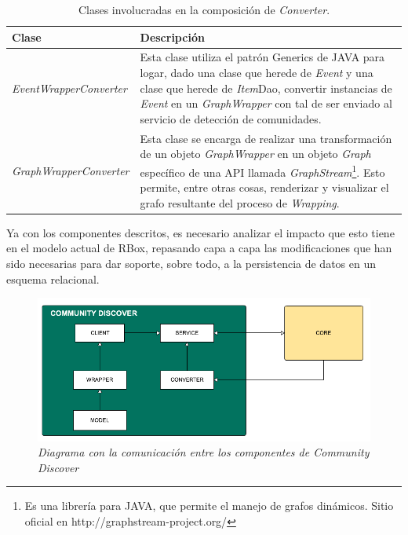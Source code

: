 \begin{table}[H]
  \begin{center}
    \caption{Clases involucradas en la composición de \textit{Converter}.}
    \label{tab:arq-tab05}
      \begin{tabular}{|L{4cm}|L{10cm}|}
        \hline
        \textbf{Clase} & \textbf{Descripción}\\ \hline
         \textit{\textit{Event}WrapperConverter} & Esta clase utiliza el patrón Generics de JAVA para logar, dado una clase que herede de \textit{Event} y una clase que herede de \textit{Item}Dao, convertir instancias de \textit{Event} en un \textit{GraphWrapper} con tal de ser enviado al servicio de detección de comunidades.\\ \hline
         \textit{GraphWrapperConverter} & Esta clase se encarga de realizar una transformación de un objeto \textit{GraphWrapper} en un objeto \textit{Graph} específico de una API llamada \textit{GraphStream}\footnote{Es una librería para JAVA, que permite el manejo de grafos dinámicos. Sitio oficial en http://graphstream-project.org/}. Esto permite, entre otras cosas, renderizar y visualizar el grafo resultante del proceso de \textit{Wrapping}.\\ \hline
      \end{tabular}
  \end{center}
\end{table}

Ya con los componentes descritos, es necesario analizar el impacto que esto tiene en el modelo actual de RBox, repasando capa a capa las modificaciones que han sido necesarias para dar soporte, sobre todo, a la persistencia de datos en un esquema relacional.

\begin{figure}
  \centering
  \includegraphics[scale=.6]{images/Figura4-2}
  \caption{\em Diagrama con la comunicación entre los componentes de \textit{Community Discover}}
  \label{fig:arq-im2}
\end{figure}

